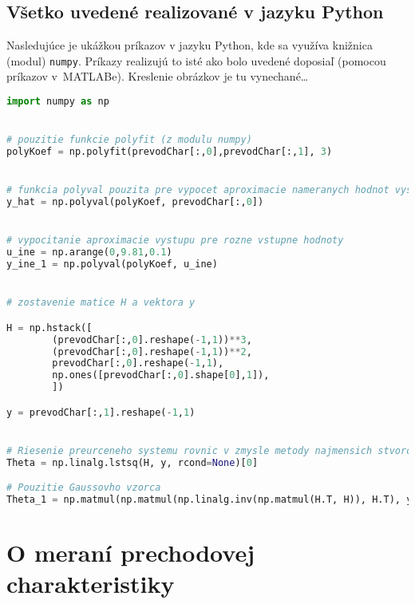 \documentclass[a4paper, 10pt, ]{article}
\begin{document}
\subsection{Všetko uvedené realizované v jazyku Python}


Nasledujúce je ukážkou príkazov v jazyku Python, kde sa využíva knižnica (modul) \verb|numpy|. Príkazy realizujú to isté ako bolo uvedené doposiaľ (pomocou príkazov v~MATLABe). Kreslenie obrázkov je tu vynechané\ldots



\begin{lstlisting}[language=Python,]
import numpy as np


# pouzitie funkcie polyfit (z modulu numpy)
polyKoef = np.polyfit(prevodChar[:,0],prevodChar[:,1], 3)


# funkcia polyval pouzita pre vypocet aproximacie nameranych hodnot vystupu
y_hat = np.polyval(polyKoef, prevodChar[:,0])


# vypocitanie aproximacie vystupu pre rozne vstupne hodnoty
u_ine = np.arange(0,9.81,0.1)
y_ine_1 = np.polyval(polyKoef, u_ine)


# zostavenie matice H a vektora y

H = np.hstack([
        (prevodChar[:,0].reshape(-1,1))**3,
        (prevodChar[:,0].reshape(-1,1))**2,
        prevodChar[:,0].reshape(-1,1),
        np.ones([prevodChar[:,0].shape[0],1]),
        ])

y = prevodChar[:,1].reshape(-1,1)


# Riesenie preurceneho systemu rovnic v zmysle metody najmensich stvorcov
Theta = np.linalg.lstsq(H, y, rcond=None)[0]

# Pouzitie Gaussovho vzorca
Theta_1 = np.matmul(np.matmul(np.linalg.inv(np.matmul(H.T, H)), H.T), y)

\end{lstlisting}






\section{O meraní prechodovej charakteristiky}



\end{document}
